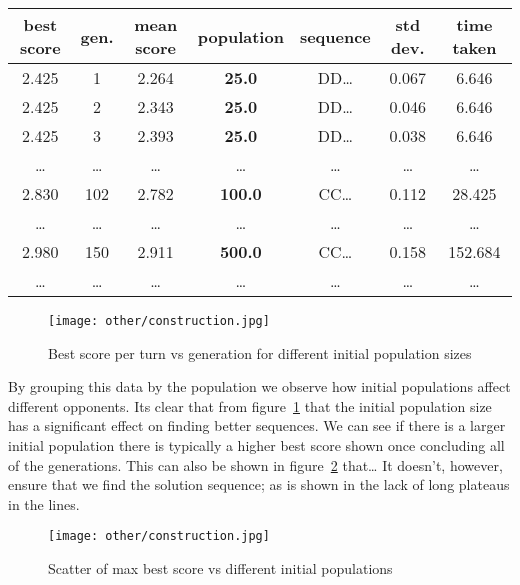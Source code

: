 \begin{center}
    \begin{tabular}{|c|c|c|c|c|c|c|} 
        \hline
        best score & gen. & mean score & population & sequence & std dev. & time taken \\
        \hline
        2.425 & 1 & 2.264 & \textbf{25.0} & DD\ldots & 0.067 & 6.646\\
        2.425 & 2 & 2.343 & \textbf{25.0} & DD\ldots & 0.046 & 6.646\\
        2.425 & 3 & 2.393 & \textbf{25.0} & DD\ldots & 0.038 & 6.646\\
        \ldots  & \ldots  & \ldots  & \ldots  & \ldots  & \ldots  & \ldots \\
        2.830 & 102 & 2.782 & \textbf{100.0} & CC\ldots & 0.112 & 28.425\\
        \ldots  & \ldots  & \ldots  & \ldots  & \ldots  & \ldots  & \ldots \\
        2.980 & 150 & 2.911 & \textbf{500.0} & CC\ldots & 0.158 & 152.684\\
        \ldots  & \ldots  & \ldots  & \ldots  & \ldots  & \ldots  & \ldots \\
        \hline
        \end{tabular}
\end{center}

\begin{figure}
    \texttt{[image: other/construction.jpg]}
    \caption{Best score per turn vs generation for different initial population sizes}\label{fig:INIT-POP-bs-v-gens-all}
\end{figure}

By grouping this data by the population we observe how initial populations affect different opponents. 
Its clear that from figure~\ref{fig:INIT-POP-bs-v-gens-all} that the initial population size has a significant effect on finding better sequences.
We can see if there is a larger initial population there is typically a higher best score shown once concluding all of the generations.
This can also be shown in figure~\ref{fig:INIT-POP-max-bs-v-init-pop-all} that\ldots
It doesn't, however, ensure that we find the solution sequence; as is shown in the lack of long plateaus in the lines.\\

\begin{figure}
    \texttt{[image: other/construction.jpg]}
    \caption{Scatter of max best score vs different initial populations}\label{fig:INIT-POP-max-bs-v-init-pop-all}
\end{figure}


